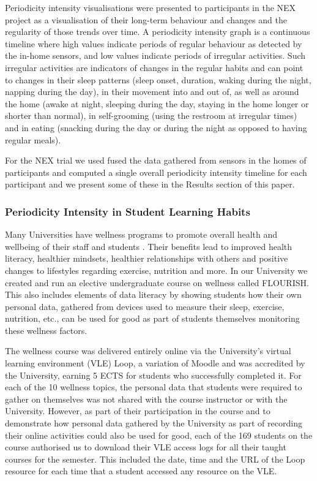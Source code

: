 \documentclass[preprints,article,accept,pdftex,moreauthors]{Definitions/mdpi}
\begin{document}
Periodicity intensity  {visualisations were}  presented to participants in the NEX project as a visualisation of their long-term behaviour and changes and the regularity of those trends over time. A periodicity intensity graph is a continuous timeline where high values indicate periods of regular behaviour as detected by the in-home sensors, and low values indicate periods of irregular activities. Such irregular activities are indicators of changes in the regular habits and can point to changes in their sleep patterns (sleep onset, duration, waking during the night, napping during the day), in  {their} movement  {into and out of, as well as around the home} (awake at night, sleeping during the day, staying in the home longer or shorter than normal), in self-grooming (using  {the} restroom at irregular times) and in eating (snacking during the day or during the night as opposed to  {having} regular meals).

For the NEX trial we used fused the data gathered from sensors in the homes of participants and computed a single overall periodicity intensity timeline for each participant and we present some of these in the Results section  {of this paper}.

\subsubsection{Periodicity Intensity in Student Learning Habits}

Many Universities have wellness programs to promote overall health and wellbeing of their staff and students \cite{baik2019universities}. Their benefits lead to improved health literacy, healthier mindsets, healthier relationships with others and positive changes to lifestyles regarding exercise, nutrition and {more}.  In our University we created and {run} an elective {undergraduate} course on wellness called FLOURISH{. This } also includes elements of data literacy by showing students how their own personal data, gathered from devices used to measure their sleep, exercise, nutrition, etc., {can} be used for good as part of students themselves monitoring these wellness factors. 

The wellness course was delivered entirely online via the University's virtual learning environment (VLE) Loop, a variation of Moodle and was accredited by the University, earning 5 ECTS for students who successfully completed it.  For each of the {10} wellness topics, the personal data that students were required to gather on themselves was not shared with the course instructor or with the University. However, as part of their participation in the course and to demonstrate how personal data gathered by the University as part of recording their online activities could also be used for good, each of the 169 students on the course authorised us to download their VLE access logs for all their taught courses for the semester. This included the {date, time and the URL of the Loop resource for each time that a student accessed any resource on the VLE}.
\end{document}
